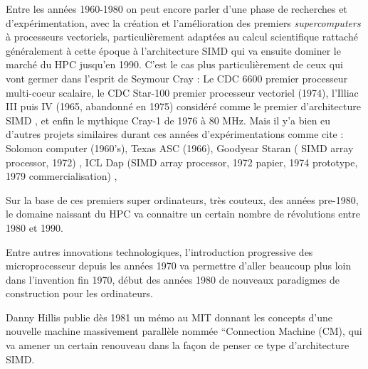 Entre les années 1960-1980 on peut encore parler d'une phase de recherches et d'expérimentation, avec la création et l'amélioration des premiers \textit{supercomputers} à processeurs vectoriels, particulièrement adaptées au calcul scientifique rattaché généralement à cette époque à l'architecture SIMD  qui va ensuite dominer le marché du HPC jusqu'en 1990. C'est le cas plus particulièrement de ceux qui vont germer dans l'esprit de Seymour Cray : Le CDC 6600 premier processeur multi-coeur scalaire, le CDC Star-100 premier processeur vectoriel (1974), l'Illiac III puis IV (1965, abandonné en 1975) considéré comme le premier d'architecture SIMD \autocite{Muraoka2012}, et enfin le mythique Cray-1 de 1976 à  80 MHz. Mais il y'a bien eu d'autres projets similaires durant ces années d'expérimentations comme cite \textcite[387-388]{Steele2011} : Solomon computer (1960's), Texas ASC (1966), Goodyear Staran ( SIMD array processor, 1972) , ICL Dap (SIMD array processor, 1972 papier, 1974 prototype, 1979 commercialisation) , %


Sur la base de ces premiers super ordinateurs, très couteux, des années pre-1980, le domaine naissant du HPC va connaitre un certain nombre de révolutions entre 1980 et 1990.

Entre autres innovations technologiques, l'introduction progressive des microprocesseur depuis les années 1970 va permettre d'aller beaucoup plus loin dans l'invention fin 1970, début des années 1980 de nouveaux paradigmes de construction pour les ordinateurs. %

Danny Hillis publie dès 1981 un mémo au MIT donnant les concepts d'une nouvelle machine massivement parallèle nommée “Connection Machine (CM), qui va amener un certain renouveau dans la façon de penser ce type d'architecture SIMD.

